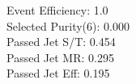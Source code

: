 Event Efficiency:   1.0\\ 
Selected Purity(6): 0.000\\ 
Passed Jet S/T:     0.454\\ 
Passed Jet MR:      0.295\\ 
Passed Jet Eff:     0.195